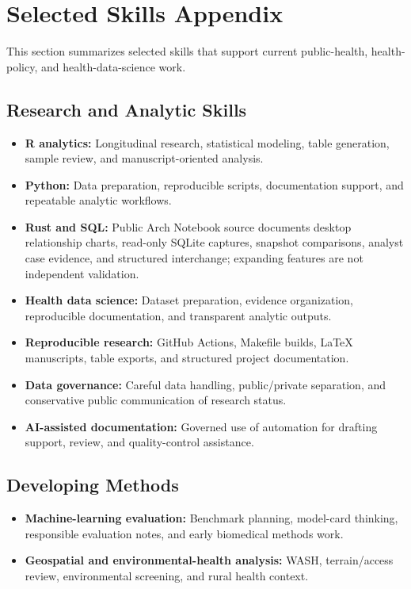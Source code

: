 
\section*{Selected Skills Appendix}

This section summarizes selected skills that support current public-health, health-policy, and health-data-science work.

\subsection*{Research and Analytic Skills}

\begin{itemize}
    \item \textbf{R analytics:} Longitudinal research, statistical modeling, table generation, sample review, and manuscript-oriented analysis.
    \item \textbf{Python:} Data preparation, reproducible scripts, documentation support, and repeatable analytic workflows.
    \item \textbf{Rust and SQL:} Public Arch Notebook source documents desktop relationship charts, read-only SQLite captures, snapshot comparisons, analyst case evidence, and structured interchange; expanding features are not independent validation.
    \item \textbf{Health data science:} Dataset preparation, evidence organization, reproducible documentation, and transparent analytic outputs.
    \item \textbf{Reproducible research:} GitHub Actions, Makefile builds, LaTeX manuscripts, table exports, and structured project documentation.
    \item \textbf{Data governance:} Careful data handling, public/private separation, and conservative public communication of research status.
    \item \textbf{AI-assisted documentation:} Governed use of automation for drafting support, review, and quality-control assistance.
\end{itemize}

\subsection*{Developing Methods}

\begin{itemize}
    \item \textbf{Machine-learning evaluation:} Benchmark planning, model-card thinking, responsible evaluation notes, and early biomedical methods work.
    \item \textbf{Geospatial and environmental-health analysis:} WASH, terrain/access review, environmental screening, and rural health context.
\end{itemize}
